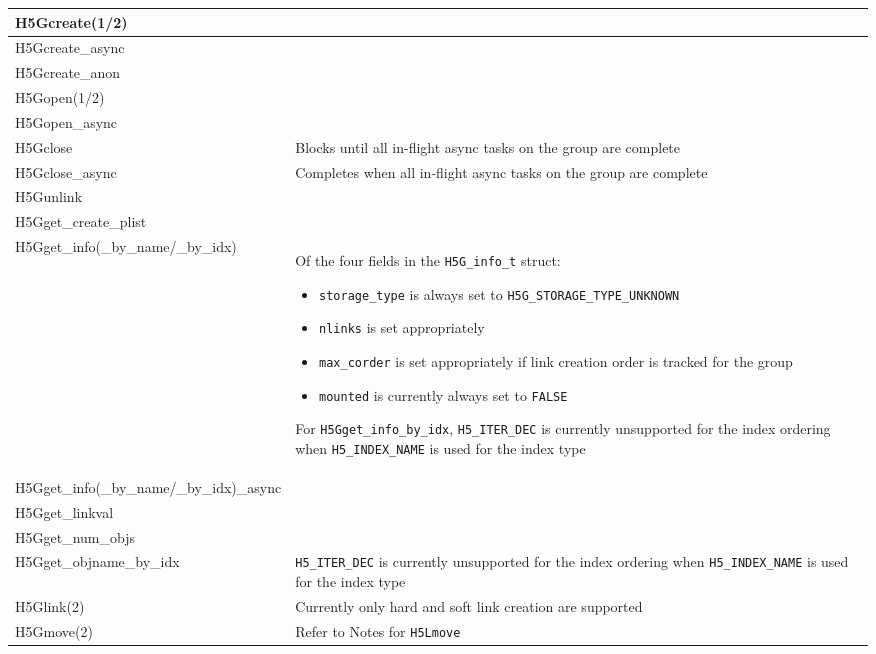 \documentclass[../users_guide.tex]{subfiles}
\begin{document}
\begin{center}
\begin{tabularx}{\linewidth}{| X | >{\RaggedRight}X |}
H5Gcreate(1/2) & \\ \hline
H5Gcreate\_async & \\ \hline
H5Gcreate\_anon & \\ \hline
H5Gopen(1/2) & \\ \hline
H5Gopen\_async & \\ \hline
H5Gclose & Blocks until all in-flight async tasks on the group are complete\\ \hline
H5Gclose\_async & Completes when all in-flight async tasks on the group are complete\\ \hline
H5Gunlink & \\ \hline
H5Gget\_create\_plist & \\ \hline
H5Gget\_info(\_by\_name/\_by\_idx) & Of the four fields in the \texttt{H5G\_info\_t} struct:
                                     \begin{itemize}
                                         \item \texttt{storage\_type} is always set to \texttt{H5G\_STORAGE\_TYPE\_UNKNOWN}
                                         \item \texttt{nlinks} is set appropriately
                                         \item \texttt{max\_corder} is set appropriately if link creation order is tracked for the group
                                         \item \texttt{mounted} is currently always set to \texttt{FALSE}
                                     \end{itemize}
                                     For \texttt{H5Gget\_info\_by\_idx}, \texttt{H5\_ITER\_DEC} is currently unsupported for the index ordering when \texttt{H5\_INDEX\_NAME} is used for the index type\\ \hline
H5Gget\_info(\_by\_name/\_by\_idx)\_async & \\ \hline
H5Gget\_linkval & \\ \hline
H5Gget\_num\_objs & \\ \hline
H5Gget\_objname\_by\_idx & \texttt{H5\_ITER\_DEC} is currently unsupported for the index ordering when \texttt{H5\_INDEX\_NAME} is used for the index type\\ \hline
H5Glink(2) & Currently only hard and soft link creation are supported\footnotemark[1]\\ \hline
H5Gmove(2) & Refer to Notes for \texttt{H5Lmove}\\ \hline

\end{tabularx}


\end{center}
\end{document}
